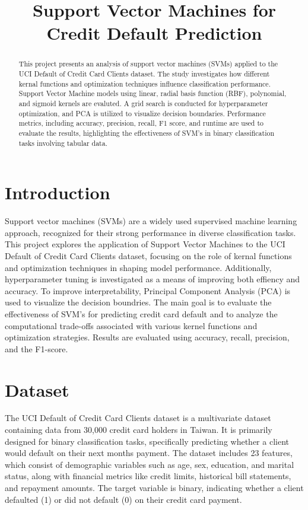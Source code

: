 \documentclass{article}
\begin{document}
\title{Support Vector Machines for Credit Default Prediction}


\maketitle

\begin{abstract}
This project presents an analysis of support vector machines (SVMs) applied to the UCI Default of Credit Card Clients dataset. 
The study investigates how different kernal functions and optimization techniques influence classification performance. 
Support Vector Machine models using linear, radial basis function (RBF), polynomial, and sigmoid kernels are evaluted. 
A grid search is conducted for hyperparameter optimization, and PCA is utilized to visualize decision boundaries. 
Performance metrics, including accuracy, precision, recall, F1 score, and runtime are used to evaluate the results, 
highlighting the effectiveness of SVM's in binary classification tasks involving tabular data.
\end{abstract}

\section{Introduction}
Support vector machines (SVMs) are a widely used supervised machine learning approach, recognized for their strong performance 
in diverse classification tasks. This project explores the application of Support Vector Machines to the UCI Default of Credit Card 
Clients dataset, focusing on the role of kernal functions and optimization techniques in shaping model performance. Additionally, 
hyperparameter tuning is investigated as a means of improving both effiency and accuracy. To improve interpretability, Principal Component Analysis (PCA) 
is used to visualize the decision boundries. The main goal is to evaluate the effectiveness of SVM's for predicting credit card default and to analyze the 
computational trade-offs associated with various kernel functions and optimization strategies. Results are evaluated using accuracy, recall, precision, and the F1-score.



\section{Dataset}

The UCI Default of Credit Card Clients dataset is a multivariate dataset containing data from 30,000 credit card holders in Taiwan. 
It is primarily designed for binary classification tasks, specifically predicting whether a client would default on their next months payment. 
The dataset includes 23 features, which consist of demographic variables such as age, sex, education, and marital status, along with financial metrics like credit limits, 
historical bill statements, and repayment amounts. The target variable is binary, indicating whether a client defaulted (1) or did not default (0) on their credit card payment. 
\end{document}
